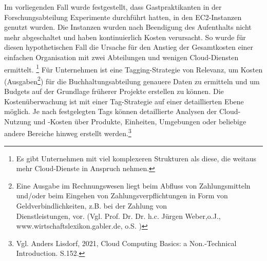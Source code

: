\begin{flushleft}
Im vorliegenden Fall wurde festgestellt, dass Gastpraktikanten in der Forschungsabteilung Experimente durchführt hatten, in den EC2-Instanzen genutzt wurden. Die Instanzen wurden nach Beendigung des Aufenthalts nicht mehr abgeschaltet und haben kontinuierlich Kosten verursacht. So wurde für diesen hypothetischen Fall die Ursache für den Anstieg der Gesamtkosten einer einfachen Organisation mit zwei Abteilungen und wenigen Cloud-Diensten ermittelt. \footnote{Es gibt Unternehmen mit viel komplexeren Strukturen als diese, die weitaus mehr Cloud-Dienste in Anspruch nehmen.} 
Für Unternehmen ist eine Tagging-Strategie von Relevanz, um Kosten (Ausgaben\footnote{Eine Ausgabe im Rechnungswesen liegt beim Abfluss von Zahlungsmitteln und/oder beim Eingehen von Zahlungsverpflichtungen in Form von Geldverbindlichkeiten, z.B. bei der Zahlung von \\Dienstleistungen, vor. (Vgl. Prof. Dr. Dr. h.c. Jürgen Weber,o.J., www.wirtschaftslexikon.gabler.de, o.S. \cite{AUS})}) für die Buchhaltungsabteilung genauere Daten zu ermitteln und um Budgets auf der Grundlage früherer Projekte erstellen zu können. Die Kostenüberwachung ist mit einer Tag-Strategie auf einer detaillierten Ebene möglich. Je nach festgelegten Tags können detaillierte Analysen der Cloud-Nutzung und -Kosten über Produkte, Einheiten, Umgebungen oder beliebige andere Bereiche hinweg erstellt werden.\footnote{Vgl. Anders Lisdorf, 2021, Cloud Computing Basics: a Non.-Technical Introduction. S.152.\cite{CCB}}
\end{flushleft}
